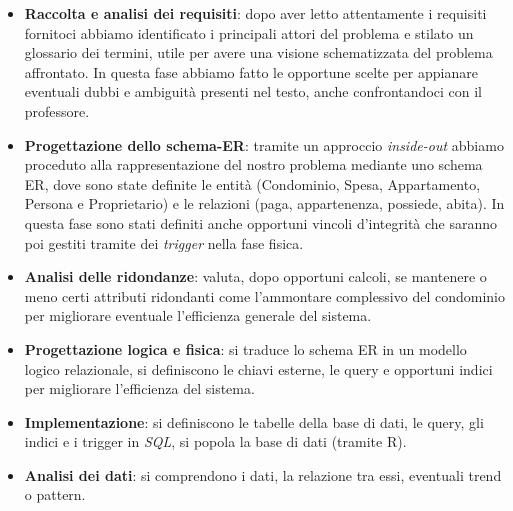 \begin{itemize}
    \item \textbf{Raccolta e analisi dei requisiti}: dopo aver letto attentamente i requisiti fornitoci abbiamo identificato i principali attori del problema e stilato un glossario dei termini, utile per avere una visione schematizzata del problema affrontato. In questa fase abbiamo fatto le opportune scelte per appianare eventuali dubbi e ambiguità presenti nel testo, anche confrontandoci con il professore.
    \item \textbf{Progettazione dello schema-ER}: tramite un approccio \textit{inside-out} abbiamo proceduto alla rappresentazione del nostro problema mediante uno schema ER, dove sono state definite le entità (Condominio, Spesa, Appartamento, Persona e Proprietario) e le relazioni (paga, appartenenza, possiede, abita). In questa fase sono stati definiti anche opportuni vincoli d'integrità che saranno poi gestiti tramite dei \textit{trigger} nella fase fisica.
    \item \textbf{Analisi delle ridondanze}: valuta, dopo opportuni calcoli, se mantenere o meno certi attributi ridondanti come l'ammontare complessivo del condominio per migliorare eventuale l'efficienza generale del sistema.
    \item \textbf{Progettazione logica e fisica}: si traduce lo schema ER in un modello logico relazionale, si definiscono le chiavi esterne, le query e opportuni indici per migliorare l'efficienza del sistema.
    \item \textbf{Implementazione}: si definiscono le tabelle della base di dati, le query, gli indici e i trigger in \textit{SQL}, si popola la base di dati (tramite R).
    \item \textbf{Analisi dei dati}: si comprendono i dati, la relazione tra essi, eventuali trend o pattern.
\end{itemize}